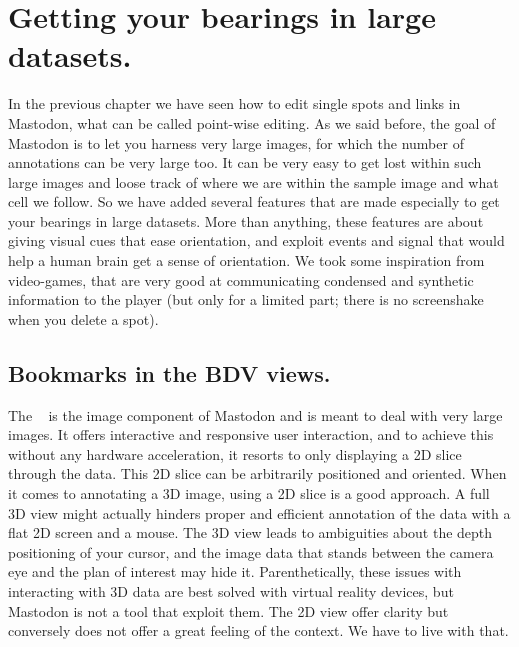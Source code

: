 \section{Getting your bearings in large datasets.}

In the previous chapter we have seen how to edit single spots and links in Mastodon, what can be called point-wise editing.
As we said before, the goal of Mastodon is to let you harness very large images, for which the number of annotations can be very large too.
It can be very easy to get lost within such large images and loose track of where we are within the sample image and what cell we follow. 
So we have added several features that are made especially to get your bearings in large datasets.
More than anything, these features are about giving visual cues that ease orientation, and exploit events and signal that would help a human brain get a sense of orientation. 
We took some inspiration from video-games, that are very good at communicating condensed and synthetic information to the player
(but only for a limited part; there is no screenshake when you delete a spot).


\subsection{Bookmarks in the BDV views.}

The \bdv~\cite{bdv} is the image component of Mastodon and is meant to deal with very large images.
It offers interactive and responsive user interaction, and to achieve this without any hardware acceleration, it resorts to only displaying a 2D slice through the data.
This 2D slice can be arbitrarily positioned and oriented. 
When it comes to annotating a 3D image, using a 2D slice is a good approach. 
A full 3D view might actually hinders proper and efficient annotation of the data with a flat 2D screen and a mouse. 
The 3D view leads to ambiguities about the depth positioning of your cursor, and the image data that stands between the camera eye and the plan of interest may hide it.
Parenthetically, these issues with interacting with 3D data are best solved with virtual reality devices, but Mastodon is not a tool that exploit them.
The 2D view offer clarity but conversely does not offer a great feeling of the context. 
We have to live with that.

